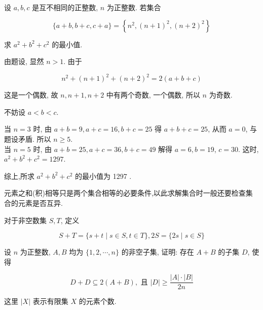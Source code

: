 \begin{example}
	设 $a ,  b ,  c$ 是互不相同的正整数, $n$ 为正整数. 若集合

	$$
		\{a+b, b+c, c+a\}=\left\{n^{2},(n+1)^{2},(n+2)^{2}\right\}
	$$

	求 $a^{2}+b^{2}+c^{2}$ 的最小值.
\end{example}

\begin{solution}
	由题设, 显然 $n>1$. 由于

	$$
		n^{2}+(n+1)^{2}+(n+2)^{2}=2(a+b+c)
	$$

	这是一个偶数, 故 $n ,  n+1 ,  n+2$ 中有两个奇数, 一个偶数, 所以 $n$ 为奇数.

	不妨设 $a<b<c$.

	当 $n=3$ 时, 由 $a+b=9, a+c=16, b+c=25$ 得 $a+b+c=25$, 从而 $a=0$, 与题设矛盾. 所以 $n \geqslant 5$.\\
	当 $n=5$ 时, 由 $a+b=25, a+c=36, b+c=49$ 解得 $a=6, b=19$, $c=30$. 这时, $a^{2}+b^{2}+c^{2}=1297$.

	综上,所求 $a^{2}+b^{2}+c^{2}$ 的最小值为 1297 .
\end{solution}

\begin{note}
	元素之和(积)相等只是两个集合相等的必要条件,以此求解集合时一般还要检查集合的元素是否互异.
\end{note}

\begin{example}\label{ex:6}
	对于非空数集 $S ,  T$, 定义

	$$
		S+T=\{s+t \mid s \in S, t \in T\}, 2 S=\{2 s \mid s \in S\}
	$$

	设 $n$ 为正整数, $A ,  B$ 均为 $\{1,2, \cdots, n\}$ 的非空子集, 证明: 存在 $A+B$ 的子集 $D$, 使得

	$$
		D+D \subseteq 2(A+B), \text { 且 }|D| \geqslant \frac{|A| \cdot|B|}{2 n}
	$$

	这里 $|X|$ 表示有限集 $X$ 的元素个数.
\end{example}

